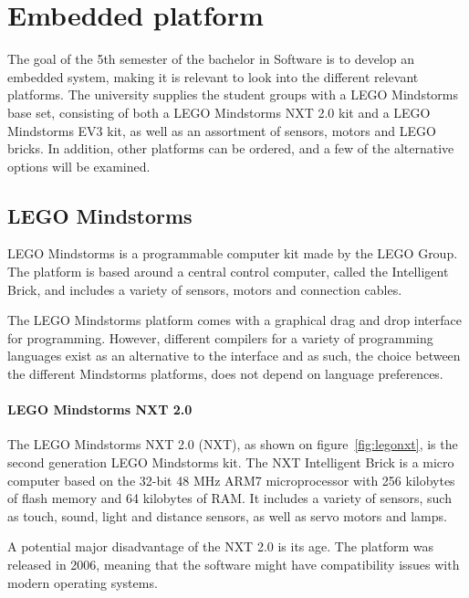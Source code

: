 

\section{Embedded platform}
The goal of the 5th semester of the bachelor in Software is to develop an embedded system, making it is relevant to look into the different relevant platforms.
The university supplies the student groups with a LEGO Mindstorms base set, consisting of both a LEGO Mindstorms NXT 2.0 kit and a LEGO Mindstorms EV3 kit, as well as an assortment of sensors, motors and LEGO bricks.
In addition, other platforms can be ordered, and a few of the alternative options will be examined.

\subsection{LEGO Mindstorms}
LEGO Mindstorms is a programmable computer kit made by the LEGO Group.
The platform is based around a central control computer, called the Intelligent Brick, and includes a variety of sensors, motors and connection cables.

The LEGO Mindstorms platform comes with a graphical drag and drop interface for programming.
However, different compilers for a variety of programming languages exist as an alternative to the interface and as such, the choice between the different Mindstorms platforms, does not depend on language preferences.

\paragraph{LEGO Mindstorms NXT 2.0}
The LEGO Mindstorms NXT 2.0 (NXT), as shown on figure~\autoref{fig:legonxt}, is the second generation LEGO Mindstorms kit.%
The NXT Intelligent Brick is a micro computer based on the 32-bit 48 MHz ARM7 microprocessor with 256 kilobytes of flash memory and 64 kilobytes of RAM\cite{nxt2userguide}\cite{nxt2ev3compare}.
It includes a variety of sensors, such as touch, sound, light and distance sensors, as well as servo motors and lamps.

A potential major disadvantage of the NXT 2.0 is its age.
The platform was released in 2006, meaning that the software might have compatibility issues with modern operating systems.

